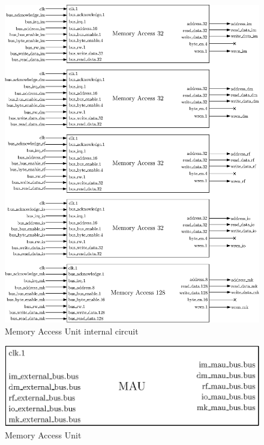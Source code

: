 \begin{figure}[H]
    \center
    \includegraphics[width=\linewidth]{"Chapter4-MAU_CTRLU/res/mau_in"}
    \caption{Memory Access Unit internal circuit}
    \label{fig:mau_in}
\end{figure}

\begin{figure}[H]
    \center
    \includegraphics[scale=0.8]{"Chapter4-MAU_CTRLU/res/mau"}
    \caption{Memory Access Unit}
    \label{fig:mau}
\end{figure}